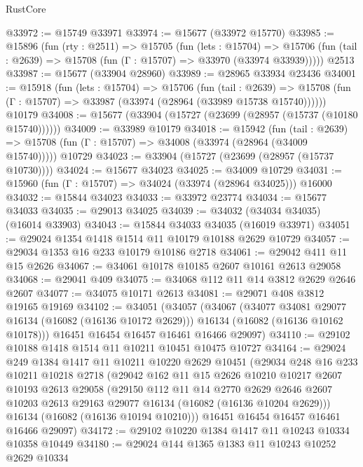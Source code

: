 \begin{lexlean}{RustCore}
\begin{coremodule}
@33972 := @15749 @33971
@33974 := @15677 (@33972 @15770)
@33985 := @15896
    (fun (rty : @2511) =>
    @15705
      (fun (lets : @15704) =>
      @15706 (fun (tail : @2639) => @15708 (fun (Γ : @15707) => @33970 (@33974 @33939)))))
    @2513
@33987 := @15677 (@33904 @28960)
@33989 := @28965 @33934 @23436
@34001 := @15918
    (fun (lets : @15704) =>
    @15706
      (fun (tail : @2639) =>
      @15708 (fun (Γ : @15707) => @33987 (@33974 (@28964 (@33989 @15738 @15740))))))
    @10179
@34008 := @15677 (@33904 (@15727 (@23699 (@28957 (@15737 (@10180 @15740))))))
@34009 := @33989 @10179
@34018 := @15942
    (fun (tail : @2639) => @15708 (fun (Γ : @15707) => @34008 (@33974 (@28964 (@34009 @15740)))))
    @10729
@34023 := @33904 (@15727 (@23699 (@28957 (@15737 @10730))))
@34024 := @15677 @34023
@34025 := @34009 @10729
@34031 := @15960 (fun (Γ : @15707) => @34024 (@33974 (@28964 @34025))) @16000
@34032 := @15844 @34023
@34033 := @33972 @23774
@34034 := @15677 @34033
@34035 := @29013 @34025
@34039 := @34032 (@34034 @34035) (@16014 @33903)
@34043 := @15844 @34033 @34035 (@16019 @33971)
@34051 := @29024 @1354 @1418 @1514 @11 @10179 @10188 @2629 @10729
@34057 := @29034 @1353 @16 @233 @10179 @10186 @2718
@34061 := @29042 @411 @11 @15 @2626
@34067 := @34061 @10178 @10185 @2607 @10161 @2613 @29058
@34068 := @29041 @409
@34075 := @34068 @112 @11 @14 @3812 @2629 @2646 @2607
@34077 := @34075 @10171 @2613
@34081 := @29071 @408 @3812 @19165 @19169
@34102 := @34051
    (@34057
      (@34067
        (@34077 @34081 @29077 @16134 (@16082 (@16136 @10172 @2629)))
        @16134
        (@16082 (@16136 @10162 @10178)))
      @16451
      @16454
      @16457
      @16461
      @16466
      @29097)
@34110 := @29102 @10188 @1418 @1514 @11 @10211 @10451 @10475 @10727
@34164 := @29024
    @249
    @1384
    @1417
    @11
    @10211
    @10220
    @2629
    @10451
    (@29034
      @248
      @16
      @233
      @10211
      @10218
      @2718
      (@29042
        @162
        @11
        @15
        @2626
        @10210
        @10217
        @2607
        @10193
        @2613
        @29058
        (@29150
          @112
          @11
          @14
          @2770
          @2629
          @2646
          @2607
          @10203
          @2613
          @29163
          @29077
          @16134
          (@16082 (@16136 @10204 @2629)))
        @16134
        (@16082 (@16136 @10194 @10210)))
      @16451
      @16454
      @16457
      @16461
      @16466
      @29097)
@34172 := @29102 @10220 @1384 @1417 @11 @10243 @10334 @10358 @10449
@34180 := @29024 @144 @1365 @1383 @11 @10243 @10252 @2629 @10334

\end{coremodule}
\end{lexlean}
